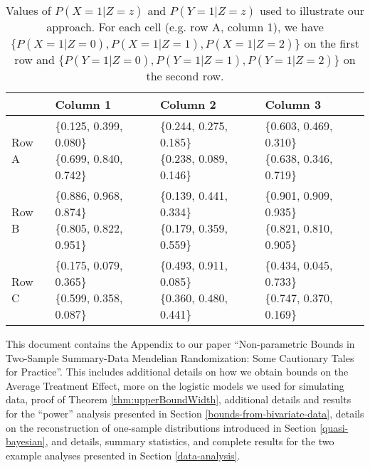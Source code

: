 \documentclass[AMA,STIX1COL,]{WileyNJD-v2}
\begin{document}
\begin{table}[ht]
  \center
  \caption{Values of $P(X = 1 | Z = z)$ and $P(Y = 1 | Z = z)$ used to illustrate our approach. For each cell (e.g. row A, column 1), we have $\{P(X = 1 | Z = 0), P(X = 1 | Z = 1), P(X = 1 | Z = 2)\}$ on the first row and $\{P(Y = 1 | Z = 0), P(Y = 1 | Z = 1), P(Y = 1 | Z = 2)\}$ on the second row.}
  \label{tab:subset_plot_summaries}
  
\begin{tabular}{llll}
\toprule
  & Column 1 & Column 2 & Column 3\\
\midrule
Row A & \makecell[l]{\{0.125, 0.399, 0.080\}\\\{0.699, 0.840, 0.742\}} & \makecell[c]{\{0.244, 0.275, 0.185\}\\\{0.238, 0.089, 0.146\}} & \makecell[r]{\{0.603, 0.469, 0.310\}\\\{0.638, 0.346, 0.719\}}\\
Row B & \makecell[l]{\{0.886, 0.968, 0.874\}\\\{0.805, 0.822, 0.951\}} & \makecell[c]{\{0.139, 0.441, 0.334\}\\\{0.179, 0.359, 0.559\}} & \makecell[r]{\{0.901, 0.909, 0.935\}\\\{0.821, 0.810, 0.905\}}\\
Row C & \makecell[l]{\{0.175, 0.079, 0.365\}\\\{0.599, 0.358, 0.087\}} & \makecell[c]{\{0.493, 0.911, 0.085\}\\\{0.360, 0.480, 0.441\}} & \makecell[r]{\{0.434, 0.045, 0.733\}\\\{0.747, 0.370, 0.169\}}\\
\bottomrule
\end{tabular}


\end{table}

\newpage

\setcounter{page}{1}

\appendix

This document contains the Appendix to our paper ``Non-parametric Bounds
in Two-Sample Summary-Data Mendelian Randomization: Some Cautionary
Tales for Practice''. This includes additional details on how we obtain
bounds on the Average Treatment Effect, more on the logistic models we
used for simulating data, proof of Theorem \ref{thm:upperBoundWidth},
additional details and results for the ``power'' analysis presented in
Section \ref{bounds-from-bivariate-data}, details on the reconstruction
of one-sample distributions introduced in Section \ref{quasi-bayesian},
and details, summary statistics, and complete results for the two
example analyses presented in Section \ref{data-analysis}.
\end{document}
